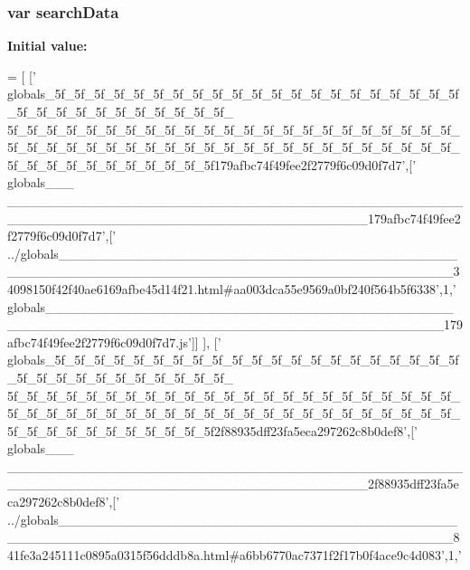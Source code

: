 \subsubsection[{search\+Data}]{\setlength{\rightskip}{0pt plus 5cm}var search\+Data}\label{variables__8_8js_ad01a7523f103d6242ef9b0451861231e}
{\bfseries Initial value\+:}
\begin{DoxyCode}
=
[
  [\textcolor{stringliteral}{'
      globals\_5f\_5f\_5f\_5f\_5f\_5f\_5f\_5f\_5f\_5f\_5f\_5f\_5f\_5f\_5f\_5f\_5f\_5f\_5f\_5f\_5f\_5f\_5f\_5f\_5f\_5f\_5f\_5f\_5f\_5f\_5f\_5f\_
      5f\_5f\_5f\_5f\_5f\_5f\_5f\_5f\_5f\_5f\_5f\_5f\_5f\_5f\_5f\_5f\_5f\_5f\_5f\_5f\_5f\_5f\_5f\_5f\_5f\_5f\_5f\_5f\_5f\_5f\_5f\_5f\_5f\_5f\_5f\_5f\_5f\_5f\_5f\_5f\_5f\_5f\_5f\_5f\_5f\_5f\_5f\_5f\_5f\_5f\_5f\_5f\_5f\_5f\_5f\_5f\_5f179afbc74f49fee2f2779f6c09d0f7d7'},[\textcolor{stringliteral}{'
      globals\_\_\_
      \_\_\_\_\_\_\_\_\_\_\_\_\_\_\_\_\_\_\_\_\_\_\_\_\_\_\_\_\_\_\_\_\_\_\_\_\_\_\_\_\_\_\_\_\_\_\_\_\_\_\_\_\_\_\_\_\_\_\_\_\_\_\_\_\_\_\_\_\_\_\_\_\_\_\_\_\_\_\_\_\_\_\_\_\_\_179afbc74f49fee2f2779f6c09d0f7d7'},[\textcolor{stringliteral}{'
      ../globals\_\_\_\_\_\_\_\_\_\_\_\_\_\_\_\_\_\_\_\_\_\_\_\_\_\_\_\_\_\_\_\_\_\_\_\_\_\_\_\_\_\_\_\_\_\_\_\_\_\_\_\_\_\_\_\_\_\_\_\_\_\_\_\_\_\_\_\_\_\_\_\_\_\_\_\_\_\_\_\_\_\_\_\_\_\_\_\_\_34098150f42f40ae6169afbe45d14f21.html#aa003dca55e9569a0bf240f564b5f6338'},1,\textcolor{stringliteral}{'
      globals\_\_\_\_\_\_\_\_\_\_\_\_\_\_\_\_\_\_\_\_\_\_\_\_\_\_\_\_\_\_\_\_\_\_\_\_\_\_\_\_\_\_\_\_\_\_\_\_\_\_\_\_\_\_\_\_\_\_\_\_\_\_\_\_\_\_\_\_\_\_\_\_\_\_\_\_\_\_\_\_\_\_\_\_\_\_\_\_\_179afbc74f49fee2f2779f6c09d0f7d7.js'}]]
      ],
  [\textcolor{stringliteral}{'
      globals\_5f\_5f\_5f\_5f\_5f\_5f\_5f\_5f\_5f\_5f\_5f\_5f\_5f\_5f\_5f\_5f\_5f\_5f\_5f\_5f\_5f\_5f\_5f\_5f\_5f\_5f\_5f\_5f\_5f\_5f\_5f\_5f\_
      5f\_5f\_5f\_5f\_5f\_5f\_5f\_5f\_5f\_5f\_5f\_5f\_5f\_5f\_5f\_5f\_5f\_5f\_5f\_5f\_5f\_5f\_5f\_5f\_5f\_5f\_5f\_5f\_5f\_5f\_5f\_5f\_5f\_5f\_5f\_5f\_5f\_5f\_5f\_5f\_5f\_5f\_5f\_5f\_5f\_5f\_5f\_5f\_5f\_5f\_5f\_5f\_5f\_5f\_5f\_5f\_5f2f88935dff23fa5eca297262c8b0def8'},[\textcolor{stringliteral}{'
      globals\_\_\_
      \_\_\_\_\_\_\_\_\_\_\_\_\_\_\_\_\_\_\_\_\_\_\_\_\_\_\_\_\_\_\_\_\_\_\_\_\_\_\_\_\_\_\_\_\_\_\_\_\_\_\_\_\_\_\_\_\_\_\_\_\_\_\_\_\_\_\_\_\_\_\_\_\_\_\_\_\_\_\_\_\_\_\_\_\_\_2f88935dff23fa5eca297262c8b0def8'},[\textcolor{stringliteral}{'
      ../globals\_\_\_\_\_\_\_\_\_\_\_\_\_\_\_\_\_\_\_\_\_\_\_\_\_\_\_\_\_\_\_\_\_\_\_\_\_\_\_\_\_\_\_\_\_\_\_\_\_\_\_\_\_\_\_\_\_\_\_\_\_\_\_\_\_\_\_\_\_\_\_\_\_\_\_\_\_\_\_\_\_\_\_\_\_\_\_\_\_841fe3a245111c0895a0315f56dddb8a.html#a6bb6770ac7371f2f17b0f4ace9c4d083'},1,\textcolor{stringliteral}{'
}
\end{DoxyCode}
